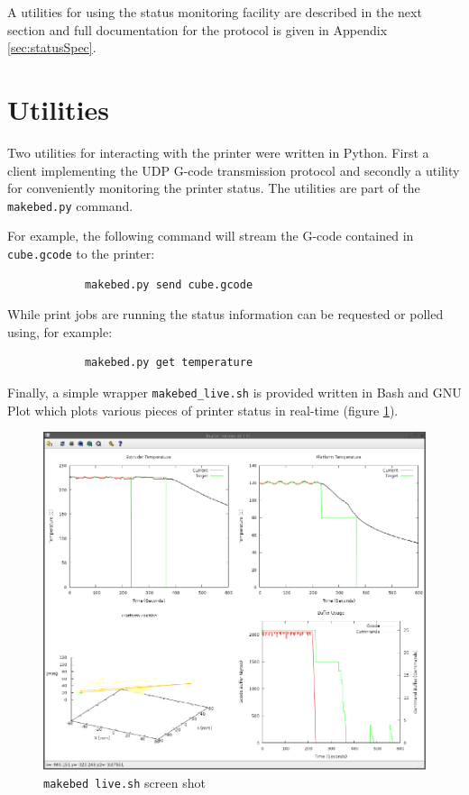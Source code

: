 				A utilities for using the status monitoring facility are described in
				the next section and full documentation for the protocol is given in
				Appendix \ref{sec:statusSpec}.
	
	
	\section{Utilities}
		
		Two utilities for interacting with the printer were written in Python. First
		a client implementing the UDP G-code transmission protocol and secondly a
		utility for conveniently monitoring the printer status. The utilities are
		part of the \verb|makebed.py| command.
		
		For example, the following command will stream the G-code contained in
		\verb|cube.gcode| to the printer:
		\begin{verbatim}
			makebed.py send cube.gcode
		\end{verbatim}
		
		While print jobs are running the status information can be requested or
		polled using, for example:
		\begin{verbatim}
			makebed.py get temperature
		\end{verbatim}
		
		Finally, a simple wrapper \verb|makebed_live.sh| is provided written in Bash
		and GNU Plot which plots various pieces of printer status in real-time
		(figure \ref{fig:makebedlive}).
		
		\begin{figure}
			\includegraphics[width=1\textwidth]{diagrams/makebedlive.pdf}
			\caption{\texttt{makebed live.sh} screen shot}
			\label{fig:makebedlive}
		\end{figure}
		
